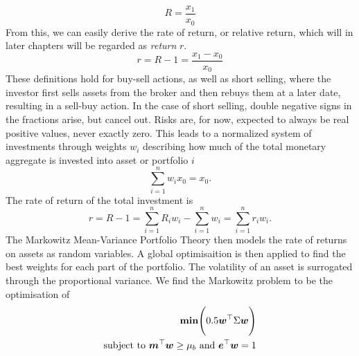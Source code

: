 \begin{equation}%
	R = \frac{x_1}{x_0}
\label{eq: Return simple definition}
\end{equation}
From this, we can easily derive the rate of return, or relative return, which will in later chapters will be regarded as \textit{return} $r$. 
\begin{equation}%
	r = R-1 = \frac{x_1 - x_0}{x_0}
\label{eq:Return_Rate_Definition}
\end{equation} 
These definitions hold for buy-sell actions, as well as short selling, where the investor first sells assets from the broker and then rebuys them at a later date, resulting in a sell-buy action. In the case of short selling, double negative signs in the fractions arise, but cancel out. Risks are, for now, expected to always be real positive values, never exactly zero. This leads to a normalized system of investments through weights $w_i$ describing how much of the total monetary aggregate is invested into asset or portfolio $i$
\begin{equation}%
	\sum_{i=1}^{n} w_i x_0 = x_0.
\label{eq: Normalization of Sum of Investments}
\end{equation}
The rate of return of the total investment is
\begin{equation}%
	r = R-1 = \sum_{i=1}^{n} R_i w_i - \sum_{i=1}^{n} w_i = \sum_{i=1}^{n} r_i w_i.
\label{eq: total rate of return}
\end{equation}
The Markowitz Mean-Variance Portfolio Theory then models the rate of returns on assets as random variables. A global optimisaition is then applied to find the best weights for each part of the portfolio. The volatility of an asset is surrogated through the proportional variance. We find the Markowitz problem to be the optimisation of
\begin{subequations}
	\label{eq:Markowitz Optimisation Problem}
	\begin{align}
	\text{\textbf{min}} \Bigg( 0.5 \bm{w}^{\top} \Sigma \bm{w} \Bigg)         \label{eq:Optimisation} \\
	\text{subject to }\bm{m}^{\top} \bm{w} \geq \mu_b \text{ and }\bm{e}^{\top}\bm{w}=1         \label{eq:Conditions}
	\end{align}
\end{subequations}
